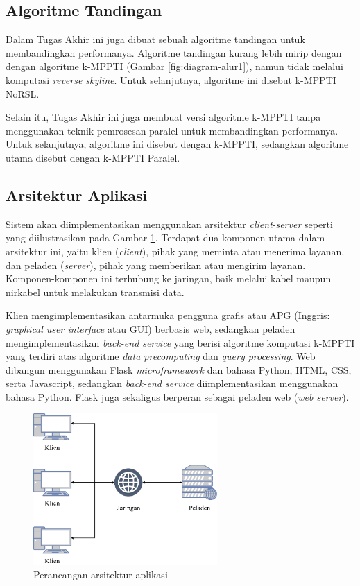 \subsection{Algoritme Tandingan}
\tab Dalam Tugas Akhir ini juga dibuat sebuah algoritme tandingan untuk membandingkan performanya. Algoritme tandingan kurang lebih mirip dengan dengan algoritme k-MPPTI (Gambar \ref{fig:diagram-alur1}), namun tidak melalui komputasi \textit{reverse skyline}. Untuk selanjutnya, algoritme ini disebut k-MPPTI NoRSL.

Selain itu, Tugas Akhir ini juga membuat versi algoritme k-MPPTI tanpa menggunakan teknik pemrosesan paralel untuk membandingkan performanya. Untuk selanjutnya, algoritme ini disebut dengan k-MPPTI, sedangkan algoritme utama disebut dengan k-MPPTI Paralel.

\subsection{Arsitektur Aplikasi} 
\tab Sistem akan diimplementasikan menggunakan arsitektur \textit{client}-\textit{server} seperti yang diilustrasikan pada Gambar \ref{fig:arsitektur}. Terdapat dua komponen utama dalam arsitektur ini, yaitu klien (\textit{client}), pihak yang meminta atau menerima layanan, dan peladen (\textit{server}), pihak yang memberikan atau mengirim layanan. Komponen-komponen ini terhubung ke jaringan, baik melalui kabel maupun nirkabel untuk melakukan transmisi data. 

Klien mengimplementasikan antarmuka pengguna grafis atau APG (Inggris: \textit{graphical user interface} atau GUI) berbasis web, sedangkan peladen mengimplementasikan \textit{back-end service} yang berisi algoritme komputasi k-MPPTI yang terdiri atas algoritme \textit{data precomputing} dan \textit{query processing}. Web dibangun menggunakan Flask \textit{microframework} dan bahasa Python, HTML, CSS, serta Javascript, sedangkan \textit{back-end service} diimplementasikan menggunakan bahasa Python. Flask juga sekaligus berperan sebagai peladen web (\textit{web server}).

\begin{figure}[h]
	\centering
	\includegraphics[width=7cm]{assets/img/bab3/arsitektur.png}
	\caption{Perancangan arsitektur aplikasi}
	\label{fig:arsitektur}
\end{figure}

